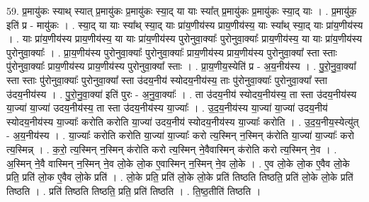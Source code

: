 \documentclass[17pt]{extarticle}
\begin{document}
59. प्र॒मायु॑कः स्याथ् स्यात् प्र॒मायु॑कः प्र॒मायु॑कः स्या॒द् या याः स्या᳚त् प्र॒मायु॑कः प्र॒मायु॑कः स्या॒द् याः । . प्र॒मायु॑क॒ इति॑ प्र - मायु॑कः । . स्या॒द् या याः स्या᳚थ् स्या॒द् याः प्रा॑य॒णीय॑स्य प्राय॒णीय॑स्य॒ याः स्या᳚थ् स्या॒द् याः प्रा॑य॒णीय॑स्य । . याः प्रा॑य॒णीय॑स्य प्राय॒णीय॑स्य॒ या याः प्रा॑य॒णीय॑स्य पुरोनुवा॒क्याः᳚ पुरोनुवा॒क्याः᳚ प्राय॒णीय॑स्य॒ या याः प्रा॑य॒णीय॑स्य पुरोनुवा॒क्याः᳚ । . प्रा॒य॒णीय॑स्य पुरोनुवा॒क्याः᳚ पुरोनुवा॒क्याः᳚ प्राय॒णीय॑स्य प्राय॒णीय॑स्य पुरोनुवा॒क्या᳚ स्ता स्ताः पु॑रोनुवा॒क्याः᳚ प्राय॒णीय॑स्य प्राय॒णीय॑स्य पुरोनुवा॒क्या᳚ स्ताः । . प्रा॒य॒णीय॒स्येति॑ प्र - अ॒य॒नीय॑स्य । . पु॒रो॒नु॒वा॒क्या᳚ स्ता स्ताः पु॑रोनुवा॒क्याः᳚ पुरोनुवा॒क्या᳚ स्ता उ॑दय॒नीय॑ स्योदय॒नीय॑स्य॒ ताः पु॑रोनुवा॒क्याः᳚ पुरोनुवा॒क्या᳚ स्ता उ॑दय॒नीय॑स्य । . पु॒रो॒नु॒वा॒क्या॑ इति॑ पुरः - अ॒नु॒वा॒क्याः᳚ । . ता उ॑दय॒नीय॑ स्योदय॒नीय॑स्य॒ ता स्ता उ॑दय॒नीय॑स्य या॒ज्या॑ या॒ज्या॑ उदय॒नीय॑स्य॒ ता स्ता उ॑दय॒नीय॑स्य या॒ज्याः᳚ । . उ॒द॒य॒नीय॑स्य या॒ज्या॑ या॒ज्या॑ उदय॒नीय॑ स्योदय॒नीय॑स्य या॒ज्याः᳚ करोति करोति या॒ज्या॑ उदय॒नीय॑
स्योदय॒नीय॑स्य या॒ज्याः᳚ करोति । . उ॒द॒य॒नीय॒स्येत्यु॑त् - अ॒य॒नीय॑स्य । . या॒ज्याः᳚ करोति करोति या॒ज्या॑ या॒ज्याः᳚ करो त्य॒स्मिन् न॒स्मिन् क॑रोति या॒ज्या॑ या॒ज्याः᳚ करो त्य॒स्मिन्न् । . क॒रो॒ त्य॒स्मिन् न॒स्मिन् क॑रोति करो त्य॒स्मिन् ने॒वैवास्मिन् क॑रोति करो त्य॒स्मिन् ने॒व । . अ॒स्मिन् ने॒वै वास्मिन् न॒स्मिन् ने॒व लो॒के लो॒क ए॒वास्मिन् न॒स्मिन् ने॒व लो॒के । . ए॒व लो॒के लो॒क ए॒वैव लो॒के प्रति॒ प्रति॑ लो॒क ए॒वैव लो॒के प्रति॑ । . लो॒के प्रति॒ प्रति॑ लो॒के लो॒के प्रति॑ तिष्ठति तिष्ठति॒ प्रति॑ लो॒के लो॒के प्रति॑ तिष्ठति । . प्रति॑ तिष्ठति तिष्ठति॒ प्रति॒ प्रति॑ तिष्ठति । . ति॒ष्ठ॒तीति॑ तिष्ठति । \newline
\pagebreak
{}
\end{document}
